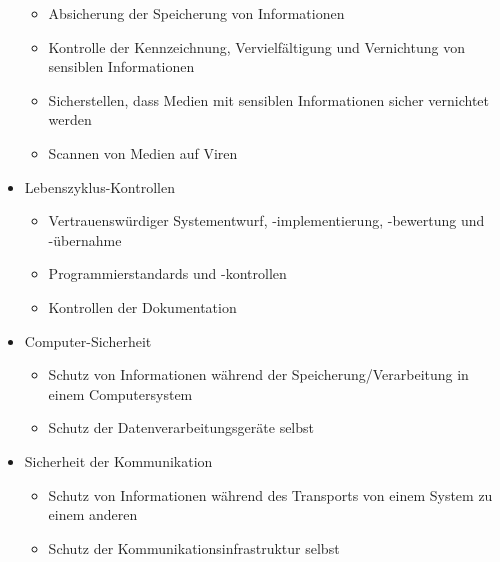 \documentclass[a4paper]{article}
\begin{document}
\begin{multicols}{3}
\begin{itemize}
              \begin{itemize}
                  \item
                        Absicherung der Speicherung von Informationen
                  \item
                        Kontrolle der Kennzeichnung, Vervielfältigung und Vernichtung von
                        sensiblen Informationen
                  \item
                        Sicherstellen, dass Medien mit sensiblen Informationen sicher
                        vernichtet werden
                  \item
                        Scannen von Medien auf Viren
              \end{itemize}
        \item
              Lebenszyklus-Kontrollen

              \begin{itemize}
                  \item
                        Vertrauenswürdiger Systementwurf, -implementierung, -bewertung und
                        -übernahme
                  \item
                        Programmierstandards und -kontrollen
                  \item
                        Kontrollen der Dokumentation
              \end{itemize}
        \item
              Computer-Sicherheit

              \begin{itemize}
                  \item
                        Schutz von Informationen während der Speicherung/Verarbeitung in
                        einem Computersystem
                  \item
                        Schutz der Datenverarbeitungsgeräte selbst
              \end{itemize}
        \item
              Sicherheit der Kommunikation

              \begin{itemize}
                  \item
                        Schutz von Informationen während des Transports von einem System zu
                        einem anderen
                  \item
                        Schutz der Kommunikationsinfrastruktur selbst
              \end{itemize}
    \end{itemize}



\end{multicols}
\end{document}
